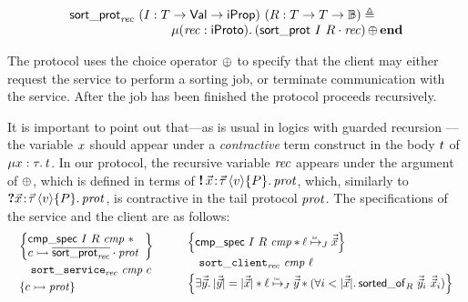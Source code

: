 \loopsortfig

\begin{equation*}
\begin{array}{l}
\listsortloopprotname\ (\interpvar : \tvar \to \Val \to \Prop)
\ (\relvar : \tvar \to \tvar \to \bool) \eqdef{} \\
\qquad\qquad\qquad\qquad \MU (\recvar : \iProto).
  \selectprot
    {(\protapp {\listsortprotname\ \interpvar\ \relvar} \recvar)}
    \protend
\end{array}
\end{equation*}

\noindent
The protocol uses the choice operator $\mathop{\oplus}$ to specify that the client
may either request the service to perform a sorting job, or terminate
communication with the service.
After the job has been finished the protocol proceeds
recursively.

It is important to point out that---as is usual in logics with guarded recursion
\cite{nakano-LICS2000}---the variable $x$ should appear under a
\emph{contractive} term construct in the body $t$ of $\MU \var:\type.\term$.
In our protocol, the recursive variable $\mathit{rec}$ appears under the argument of
$\mathop{\oplus}$, which is defined in terms of $\sendprot {\xdots} \val \iprop \prot$,
which, similarly to $\recvprot {\xdots} \val \iprop \prot$, is contractive in the
tail protocol $\mathit{prot}$.
The specifications of the service and the client are as follows:
\[
\begin{array}{c !{\quad} c}
\begin{array}{l}
\hoareV
  {\begin{array}{@{} l}
   \cmpspecname\ \interpvar\ \relvar\ \cmpvar\ *\\
   \interp \chan {\protapp {\dual\listsortloopprotname} \prot}
   \end{array}}
  {\listsortloopservicename\ \cmpvar\ \chan}
  {\interp\chan \prot}
\end{array}
&
\begin{array}{l}
\hoareV
  {\cmpspecname\ \interpvar\ \relvar\ \cmpvar *
   \listrefI \interpvarB \loc {\vec{\vec\var}}}
  {\listsortloopclientname\ \cmpvar\ \loc}
  {
    \Exists \vec{\vec\varB}.
    \listlength {\vec{\vec\varB}} = \listlength {\vec{\vec\var}} *
    \listrefI \interpvarB \loc {\vec{\vec\varB}} *
    (\All i < \listlength {\vec{\vec\var}}.
      \sortedof{\vec{\vec\varB}_i} {\vec{\vec\var}_i} \relvar)}
\end{array}
\end{array}
\]

